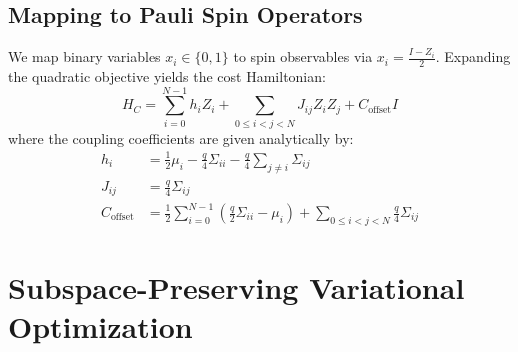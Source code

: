 \documentclass[10pt,twocolumn]{article}
\begin{document}
\subsection{Mapping to Pauli Spin Operators}
We map binary variables $x_i \in \{0, 1\}$ to spin observables via $x_i = \frac{I - Z_i}{2}$. Expanding the quadratic objective yields the cost Hamiltonian:
\begin{equation}
H_C = \sum_{i=0}^{N-1} h_i Z_i + \sum_{0 \le i < j < N} J_{ij} Z_i Z_j + C_{\text{offset}} I
\end{equation}
where the coupling coefficients are given analytically by:
\begin{align}
h_i &= \frac{1}{2}\mu_i - \frac{q}{4}\Sigma_{ii} - \frac{q}{4} \sum_{j \neq i} \Sigma_{ij} \\
J_{ij} &= \frac{q}{4} \Sigma_{ij} \\
C_{\text{offset}} &= \frac{1}{2}\sum_{i=0}^{N-1} \left(\frac{q}{2}\Sigma_{ii} - \mu_i\right) + \sum_{0 \le i < j < N} \frac{q}{4}\Sigma_{ij}
\end{align}

\begin{table}[t]
\centering
\caption{Asset Universe Characteristics ($N=8$, Historical 1-Year S\&P 500 Daily Returns)}
\label{tab:assets}
\vspace{2pt}
\end{table}

\section{Subspace-Preserving Variational Optimization}
\end{document}
